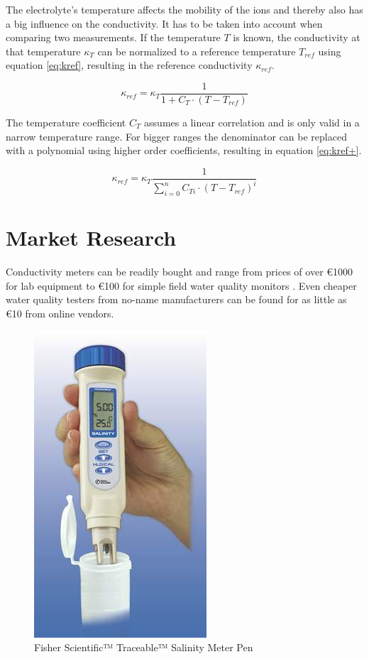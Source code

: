 The electrolyte's temperature affects the mobility of the ions and thereby also has a big influence on the conductivity. It has to be taken into account when comparing two measurements. If the temperature $ T $ is known, the conductivity at that temperature $ \kappa_{T} $ can be normalized to a reference temperature $ T_{ref} $ using equation \eqref{eq:kref}, resulting in the reference conductivity $ \kappa_{ref} $.

\begin{equation}
	\kappa_{ref} = \kappa_{T} \frac{1}{1 + C_{T} \cdot (T - T_{ref})}
\label{eq:kref}
\end{equation}

The temperature coefficient $ C_{T} $ assumes a linear correlation and is only valid in a narrow temperature range. For bigger ranges the denominator can be replaced with a polynomial using higher order coefficients, resulting in equation \eqref{eq:kref+}.

\begin{equation}
	\kappa_{ref} = \kappa_{T} \frac{1}{\sum\limits_{i=0}^n C_{Ti} \cdot (T - T_{ref})^{i}}
\label{eq:kref+}
\end{equation}

\section{Market Research}

Conductivity meters can be readily bought and range from prices of over \euro{1000} for lab equipment \parencite{expcm} to \euro{100} for simple field water quality monitors \parencite{cheapcm}. Even cheaper water quality testers from no-name manufacturers can be found for as little as \euro{10} from online vendors.

\begin{figure}[H]
	\begin{center}
    	\tikzset{external/export next=false}
		\includegraphics[scale=0.5]{images/ccm.jpg}
		\caption{Fisher Scientific™ Traceable™ Salinity Meter Pen \parencite{cheapcm}}
		\label{fig:ccm}
	\end{center}
\end{figure}


